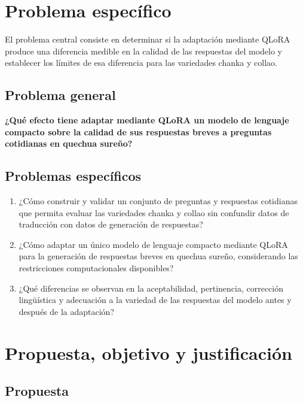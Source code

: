 \section{Problema específico}\label{planteamiento-del-problema}

El problema central consiste en determinar si la adaptación mediante QLoRA produce una diferencia medible en la calidad de las respuestas del modelo y establecer los límites de esa diferencia para las variedades chanka y collao.

\subsection{Problema general}\label{121-problema-general}

\textbf{¿Qué efecto tiene adaptar mediante QLoRA un modelo de lenguaje compacto sobre la calidad de sus respuestas breves a preguntas cotidianas en quechua sureño?}

\subsection{Problemas específicos}\label{122-problemas-especuxedficos}

\begin{enumerate}
\def\labelenumi{\arabic{enumi}.}
\item
  ¿Cómo construir y validar un conjunto de preguntas y respuestas cotidianas que permita evaluar las variedades chanka y collao sin confundir datos de traducción con datos de generación de respuestas?
\item
  ¿Cómo adaptar un único modelo de lenguaje compacto mediante QLoRA para la generación de respuestas breves en quechua sureño, considerando las restricciones computacionales disponibles?
\item
  ¿Qué diferencias se observan en la aceptabilidad, pertinencia, corrección lingüística y adecuación a la variedad de las respuestas del modelo antes y después de la adaptación?
\end{enumerate}

\section{Propuesta, objetivo y justificación}\label{propuesta-objetivo-justificacion}

\subsection{Propuesta}\label{propuesta-de-investigacion}

